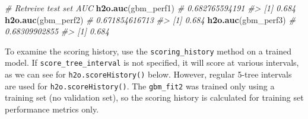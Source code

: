 \documentclass[]{book}
\newenvironment{Shaded}{\begin{snugshade}}{\end{snugshade}}
\newcommand{\CommentTok}[1]{\textcolor[rgb]{0.56,0.35,0.01}{\textit{#1}}}
\newcommand{\KeywordTok}[1]{\textcolor[rgb]{0.13,0.29,0.53}{\textbf{#1}}}
\newcommand{\NormalTok}[1]{#1}
\begin{document}
\begin{Shaded}
\begin{Highlighting}[]
\CommentTok{# Retreive test set AUC}
\KeywordTok{h2o.auc}\NormalTok{(gbm_perf1)  }\CommentTok{# 0.682765594191}
\CommentTok{#> [1] 0.684}
\KeywordTok{h2o.auc}\NormalTok{(gbm_perf2)  }\CommentTok{# 0.671854616713}
\CommentTok{#> [1] 0.684}
\KeywordTok{h2o.auc}\NormalTok{(gbm_perf3)  }\CommentTok{# 0.68309902855}
\CommentTok{#> [1] 0.684}
\end{Highlighting}
\end{Shaded}

To examine the scoring history, use the \texttt{scoring\_history} method on a trained model.
If \texttt{score\_tree\_interval} is not specified, it will score at various intervals, as we can
see for \texttt{h2o.scoreHistory()} below. However, regular 5-tree intervals are used
for \texttt{h2o.scoreHistory()}.
The \texttt{gbm\_fit2} was trained only using a training set (no validation set), so the scoring
history is calculated for training set performance metrics only.
\end{document}
